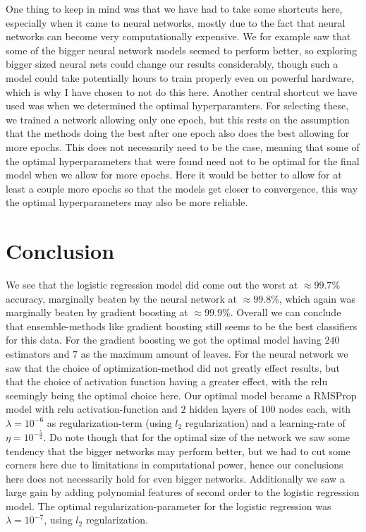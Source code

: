\documentclass{article}
\begin{document}
One thing to keep in mind was that we have had to take some shortcuts here,
especially when it came to neural networks, mostly due to the fact that neural
networks can become very computationally expensive. We for example saw that some
of the bigger neural network models seemed to perform better, so exploring
bigger sized neural nets could change our results considerably, though such a model could
take potentially hours to train properly even on powerful hardware, which is why
I have chosen to not do this here. Another central shortcut we have used was
when we determined the optimal hyperparamters.  For selecting these, we trained
a network allowing only one epoch, but this rests on the assumption that the
methods doing the best after one epoch also does the best allowing for more
epochs. This does not necessarily need to be the case, meaning that some of the
optimal hyperparameters that were found need not to be optimal for the final
model when we allow for more epochs. Here it would be better to allow for at
least a couple more epochs so that the models get closer to convergence, this
way the optimal hyperparameters may also be more reliable.

\section{Conclusion}
We see that the logistic regression model did come out the worst at $\approx
	99.7\%$ accuracy, marginally beaten by the neural network at $\approx
	99.8\%$, which again was marginally beaten by gradient boosting at $\approx
	99.9\%$. Overall we can conclude that ensemble-methods like gradient
boosting still seems to be the best classifiers for this data. For the
gradient boosting we got the optimal model having $240$ estimators and $7$
as the maximum amount of leaves.  For the neural network we saw that the
choice of optimization-method did not greatly effect results, but that the
choice of activation function having a greater effect, with the relu
seemingly being the optimal choice here. Our optimal model became a RMSProp
model with relu activation-function and  $2$ hidden layers of $100$ nodes each,
with $\lambda = 10^{-6}$ as regularization-term (using $l_2$ regularization) and
a learning-rate of $\eta = 10^{-\frac{5}{2}}$. Do note though that for the
optimal size of the network we saw some tendency that the bigger networks may
perform better, but we had to cut some corners here due to limitations in
computational power, hence our conclusions here does not necessarily hold for
even bigger networks.  Additionally we saw a large gain by adding polynomial
features of second order to the logistic regression model. The optimal
regularization-parameter for the logistic regression was $\lambda = 10^{-7}$, using $l_2$
regularization.
\end{document}
